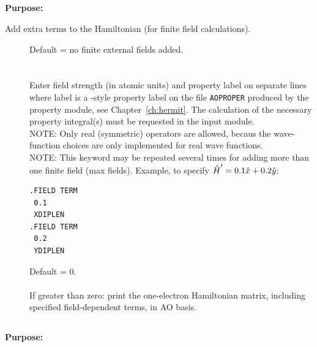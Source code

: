 \subsection{\label{ref-haminp}}

{\bf Purpose:}

Add extra terms to the Hamiltonian (for finite field calculations).

\begin{description}
\item[]
  Default = no finite external fields added. \\
   \\
   \\
  Enter field strength (in atomic units) and property label on separate lines
  where label is a \molecule-style property label on the file \verb|AOPROPER|
  produced by the property module, see Chapter~\ref{ch:hermit}.
  The calculation of the necessary property integral(s) must be requested
  in the  input module. \\
  NOTE: Only real (symmetric) operators are allowed, becaus the wave-function
  choices are only implemented for real wave functions. \\
  NOTE: This keyword may be repeated several times for adding more than
  one finite field (max \mxfelt fields). Example, to specify $\mbox{$\hat H$}' = 0.1 \mbox{$\hat x$} + 0.2 \mbox{$\hat y$}$:

\begin{inputex} \begin{verbatim}
.FIELD TERM
 0.1
 XDIPLEN
.FIELD TERM
 0.2
 YDIPLEN
\end{verbatim} \end{inputex}

\item[]
  Default = 0.\\
   \\
  If greater than zero:
  print the one-electron Hamiltonian matrix, including
  specified field-dependent terms, in AO basis.
\end{description}

\pagebreak[3]
\subsection{\label{ref-mp2inp}}

{\bf Purpose:}

